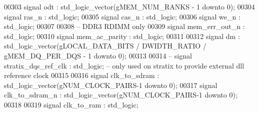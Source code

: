 \begin{DoxyCode}
00303     \textcolor{keywordflow}{signal}   \textcolor{vhdlchar}{odt}            \textcolor{vhdlchar}{:} \textcolor{comment}{std\_logic\_vector}\textcolor{vhdlchar}{(}\textcolor{vhdlchar}{gMEM_NUM_RANKS} \textcolor{vhdlchar}{-} \textcolor{vhdllogic}{}\textcolor{vhdllogic}{1} \textcolor{keywordflow}{downto} \textcolor{vhdllogic}{}\textcolor{vhdllogic}{0}\textcolor{vhdlchar}{)};
00304     \textcolor{keywordflow}{signal}   \textcolor{vhdlchar}{ras_n}          \textcolor{vhdlchar}{:} \textcolor{comment}{std\_logic};
00305     \textcolor{keywordflow}{signal}   \textcolor{vhdlchar}{cas_n}          \textcolor{vhdlchar}{:} \textcolor{comment}{std\_logic};
00306     \textcolor{keywordflow}{signal}   \textcolor{vhdlchar}{we_n}           \textcolor{vhdlchar}{:} \textcolor{comment}{std\_logic};
00307     
00308 \textcolor{keyword}{    -- DDR3 RDIMM only}
00309     \textcolor{keywordflow}{signal}   \textcolor{vhdlchar}{mem_err_out_n}  \textcolor{vhdlchar}{:} \textcolor{comment}{std\_logic};
00310     \textcolor{keywordflow}{signal}   \textcolor{vhdlchar}{mem_ac_parity}  \textcolor{vhdlchar}{:} \textcolor{comment}{std\_logic};
00311 
00312     \textcolor{keywordflow}{signal}   \textcolor{vhdlchar}{dm}             \textcolor{vhdlchar}{:} \textcolor{comment}{std\_logic\_vector}\textcolor{vhdlchar}{(}\textcolor{vhdlchar}{gLOCAL_DATA_BITS} \textcolor{vhdlchar}{/} \textcolor{vhdlchar}{DWIDTH_RATIO} \textcolor{vhdlchar}{/} \textcolor{vhdlchar}{
      gMEM_DQ_PER_DQS} \textcolor{vhdlchar}{-} \textcolor{vhdllogic}{}\textcolor{vhdllogic}{1} \textcolor{keywordflow}{downto} \textcolor{vhdllogic}{}\textcolor{vhdllogic}{0}\textcolor{vhdlchar}{)};
00313 
00314 \textcolor{keyword}{    -- signal stratix\_dqs\_ref\_clk    : std\_logic;  -- only used on stratix to provide external dll
       reference clock}
00315 
00316     \textcolor{keywordflow}{signal} \textcolor{vhdlchar}{clk_to_sdram}    \textcolor{vhdlchar}{:} \textcolor{comment}{std\_logic\_vector}\textcolor{vhdlchar}{(}\textcolor{vhdlchar}{gNUM_CLOCK_PAIRS}\textcolor{vhdlchar}{-}\textcolor{vhdllogic}{}\textcolor{vhdllogic}{1} \textcolor{keywordflow}{downto} \textcolor{vhdllogic}{}\textcolor{vhdllogic}{0}\textcolor{vhdlchar}{)};
00317     \textcolor{keywordflow}{signal} \textcolor{vhdlchar}{clk_to_sdram_n}  \textcolor{vhdlchar}{:} \textcolor{comment}{std\_logic\_vector}\textcolor{vhdlchar}{(}\textcolor{vhdlchar}{gNUM_CLOCK_PAIRS}\textcolor{vhdlchar}{-}\textcolor{vhdllogic}{}\textcolor{vhdllogic}{1} \textcolor{keywordflow}{downto} \textcolor{vhdllogic}{}\textcolor{vhdllogic}{0}\textcolor{vhdlchar}{)};
00318 
00319     \textcolor{keywordflow}{signal} \textcolor{vhdlchar}{clk_to_ram}      \textcolor{vhdlchar}{:} \textcolor{comment}{std\_logic};

\end{DoxyCode}
